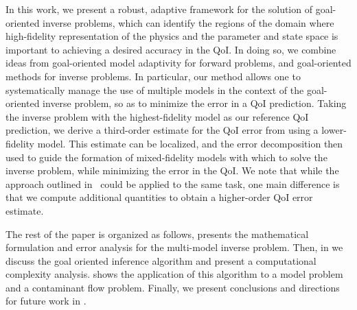 In this work, we present a robust, adaptive framework for the solution of goal-oriented inverse problems, which can identify the regions of the domain where high-fidelity representation of the physics and the parameter and state space is important to achieving a desired accuracy in the QoI. In doing so, we combine ideas from goal-oriented model adaptivity for forward problems, and goal-oriented methods for inverse problems. In particular, our method allows one to systematically manage the use of multiple models in the context of the goal-oriented inverse problem, so as to minimize the error in a QoI prediction. Taking the inverse problem with the highest-fidelity model as our reference QoI prediction, we derive a third-order estimate for the QoI error from using a lower-fidelity model. This estimate can be localized, and the error decomposition then used to guide the formation of mixed-fidelity models with which to solve the inverse problem, while minimizing the error in the QoI. We note that while the approach outlined in~\cite{OdenPrudetal10} could be applied to the same task, one main difference is that we compute additional quantities to obtain a higher-order QoI error estimate.

The rest of the paper is organized as follows,  presents the mathematical formulation and error analysis for the multi-model inverse problem. Then, in  we discuss the goal oriented inference algorithm and present a computational complexity analysis.  shows the application of this algorithm to a model problem and a contaminant flow problem. Finally, we present conclusions and directions for future work in .
